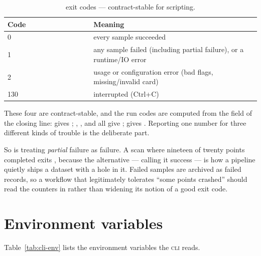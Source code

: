 \begin{table}[ht]
  \footnotesize
  \begingroup
  \setlength{\tabcolsep}{0pt}
  \begin{tabular}{@{}p{0.34\linewidth}p{0.66\linewidth}@{}}
    \toprule
    \textbf{Code} & \textbf{Meaning} \\
    \midrule
    0   & every sample succeeded \\
    1   & any sample failed (including partial failure), or a runtime/IO error \\
    2   & usage or configuration error (bad flags, missing/invalid card) \\
    130 & interrupted (Ctrl+C) \\
    \bottomrule
  \end{tabular}
  \endgroup
  \caption{ exit codes --- contract-stable for scripting.}
  \label{tab:exit-codes}
\end{table}

These four are contract-stable, and the run codes are computed from the 
field of the closing  line:  gives ;
, , and  all give ;
 gives . Reporting one number for three different kinds of
trouble is the deliberate part.

So is treating \emph{partial} failure as failure. A scan where nineteen of twenty points
completed exits , because the alternative --- calling it success --- is how a
pipeline quietly ships a dataset with a hole in it. Failed samples are archived as failed
records, so a workflow that legitimately tolerates ``some points crashed'' should read
the counters in  rather than widening its notion of a good exit
code.

\section{Environment variables}
\label{sec:cli-env}

Table~\ref{tab:cli-env} lists the environment variables the \textsc{cli} reads.

